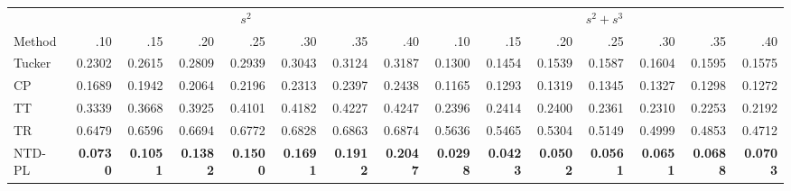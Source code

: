 \begin{tabular}{@{}lrrrrrrr@{\quad}rrrrrrr@{}}
\toprule
 & \multicolumn{7}{c}{\(s^2\)} & \multicolumn{7}{c}{\(s^2+s^3\)} \\
\cmidrule(lr){2-8}\cmidrule(l){9-15}
Method & .10 & .15 & .20 & .25 & .30 & .35 & .40 & .10 & .15 & .20 & .25 & .30 & .35 & .40 \\
\midrule
Tucker & 0.2302 & 0.2615 & 0.2809 & 0.2939 & 0.3043 & 0.3124 & 0.3187 & 0.1300 & 0.1454 & 0.1539 & 0.1587 & 0.1604 & 0.1595 & 0.1575 \\
CP & 0.1689 & 0.1942 & 0.2064 & 0.2196 & 0.2313 & 0.2397 & 0.2438 & 0.1165 & 0.1293 & 0.1319 & 0.1345 & 0.1327 & 0.1298 & 0.1272 \\
TT & 0.3339 & 0.3668 & 0.3925 & 0.4101 & 0.4182 & 0.4227 & 0.4247 & 0.2396 & 0.2414 & 0.2400 & 0.2361 & 0.2310 & 0.2253 & 0.2192 \\
TR & 0.6479 & 0.6596 & 0.6694 & 0.6772 & 0.6828 & 0.6863 & 0.6874 & 0.5636 & 0.5465 & 0.5304 & 0.5149 & 0.4999 & 0.4853 & 0.4712 \\
\midrule
NTD-PL & \textbf{0.0730} & \textbf{0.1051} & \textbf{0.1382} & \textbf{0.1500} & \textbf{0.1691} & \textbf{0.1912} & \textbf{0.2047} & \textbf{0.0298} & \textbf{0.0423} & \textbf{0.0502} & \textbf{0.0561} & \textbf{0.0651} & \textbf{0.0688} & \textbf{0.0703} \\
\bottomrule
\end{tabular}
